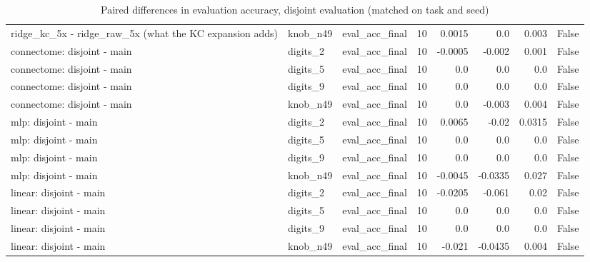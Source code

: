 \begin{table}[t]
\begin{tabular}{lllrrrrr}
ridge\_kc\_5x - ridge\_raw\_5x (what the KC expansion adds) & knob\_n49 & eval\_acc\_final & 10 & 0.0015 & 0.0 & 0.003 & False \\
connectome: disjoint - main & digits\_2 & eval\_acc\_final & 10 & -0.0005 & -0.002 & 0.001 & False \\
connectome: disjoint - main & digits\_5 & eval\_acc\_final & 10 & 0.0 & 0.0 & 0.0 & False \\
connectome: disjoint - main & digits\_9 & eval\_acc\_final & 10 & 0.0 & 0.0 & 0.0 & False \\
connectome: disjoint - main & knob\_n49 & eval\_acc\_final & 10 & 0.0 & -0.003 & 0.004 & False \\
mlp: disjoint - main & digits\_2 & eval\_acc\_final & 10 & 0.0065 & -0.02 & 0.0315 & False \\
mlp: disjoint - main & digits\_5 & eval\_acc\_final & 10 & 0.0 & 0.0 & 0.0 & False \\
mlp: disjoint - main & digits\_9 & eval\_acc\_final & 10 & 0.0 & 0.0 & 0.0 & False \\
mlp: disjoint - main & knob\_n49 & eval\_acc\_final & 10 & -0.0045 & -0.0335 & 0.027 & False \\
linear: disjoint - main & digits\_2 & eval\_acc\_final & 10 & -0.0205 & -0.061 & 0.02 & False \\
linear: disjoint - main & digits\_5 & eval\_acc\_final & 10 & 0.0 & 0.0 & 0.0 & False \\
linear: disjoint - main & digits\_9 & eval\_acc\_final & 10 & 0.0 & 0.0 & 0.0 & False \\
linear: disjoint - main & knob\_n49 & eval\_acc\_final & 10 & -0.021 & -0.0435 & 0.004 & False \\
\bottomrule
\end{tabular}
\caption{Paired differences in evaluation accuracy, disjoint evaluation (matched on task and seed)}
\label{tab:disjoint_cmp_paired}
\end{table}